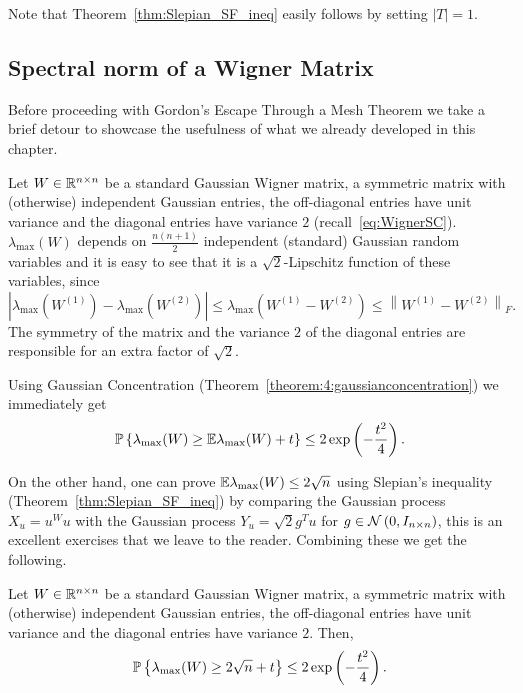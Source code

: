 Note that Theorem~\ref{thm:Slepian_SF_ineq} easily follows by setting $|T|=1$.








\subsection{Spectral norm of a Wigner Matrix}

Before proceeding with Gordon's Escape Through a Mesh Theorem we take a brief detour to showcase the usefulness of what we already developed in this chapter.

Let $W\in\mathbb{R}^{n\times n}$ be a standard Gaussian Wigner matrix, a symmetric matrix with (otherwise) independent Gaussian entries, the off-diagonal entries have unit variance and the diagonal entries have variance $2$ (recall~\eqref{eq:WignerSC}). $\lambda_{\max}(W)$ depends on $\frac{n(n+1)}2$ independent (standard) Gaussian random variables and it is easy to see that it is a $\sqrt{2}$-Lipschitz function of these variables, since
\[
\left|\lambda_{\max}(W^{(1)}) - \lambda_{\max}(W^{(2)})  \right| \leq \lambda_{\max}\left( W^{(1)} - W^{(2)} \right) \leq \left\| W^{(1)} - W^{(2)} \right\|_F.
\]
The symmetry of the matrix and the variance $2$ of the diagonal entries are responsible for an extra factor of $\sqrt{2}$.

Using Gaussian Concentration (Theorem~\ref{theorem:4:gaussianconcentration}) we immediately get
\[
{\mathbb{P}}\left\{ \lambda_{\max}(W) \geq \mathbb{E} \lambda_{\max}(W) + t  \right\} \leq 2\exp\left( -\frac{t^2}{4} \right).
\]

On the other hand, one can prove $\mathbb{E} \lambda_{\max}(W) \leq 2\sqrt{n}$ using Slepian's inequality (Theorem~\ref{thm:Slepian_SF_ineq}) by comparing the Gaussian process $X_u = u^Wu$ with the Gaussian process $Y_u = \sqrt{2}g^Tu$ for $g\in\mathcal{N}\left(0,I_{n\times n}\right)$, this is an excellent exercises that we leave to the reader. Combining these we get the following.

\begin{proposition}\label{proposition:4:WignerSpectralNormTail}
Let $W\in\mathbb{R}^{n\times n}$ be a standard Gaussian Wigner matrix, a symmetric matrix with (otherwise) independent Gaussian entries, the off-diagonal entries have unit variance and the diagonal entries have variance $2$. Then,
\[
{\mathbb{P}}\left\{ \lambda_{\max}(W) \geq 2\sqrt{n} + t  \right\} \leq 2\exp\left( -\frac{t^2}{4} \right).
\]
\end{proposition}

